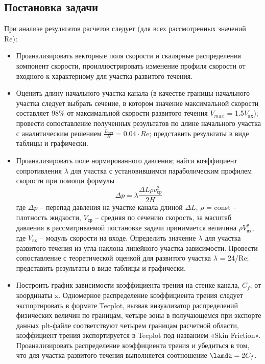 \documentclass[12pt, a4paper]{article}
\begin{document}
\subsection{Постановка задачи}
При анализе результатов расчетов следует (для всех рассмотренных значений Re):
\begin{itemize}
    \item 
        Проанализировать векторные поля скорости и скалярные распределения компонент скорости, проиллюстрировать изменение профиля скорости от входного к характерному для участка развитого течения.
    \item
        Оценить длину начального участка канала (в качестве границы начального участка следует выбрать сечение, в котором значение максимальной скорости составляет $98\%$ от максимальной скорости развитого течения $V_{max}$ = 1.5$V_{вх}$); провести сопоставление полученных результатов по длине начального участка с аналитическим решением $\frac{L_{нач}}{H} = 0.04 \cdot Re$; представить результаты в виде таблицы и графически.
    \item
        Проанализировать поле нормированного давления; найти коэффициент сопротивления $\lambda$ для участка с установившимся параболическим профилем скорости при помощи формулы 
        \begin{equation}
            \Delta p = \lambda \frac{\Delta L \rho v_{ср}^2}{2H}
        \end{equation}
        где $\Delta p$ – перепад давления на участке канала длиной $\Delta L$, $\rho$ = const – плотность жидкости, $V_{ср}$ – средняя по сечению скорость, за масштаб давления в рассматриваемой постановке задачи принимается величина $\rho V_{вх}^2$, где $V_{вх}$ – модуль скорости на входе. Определить значение $\lambda$ для участка развитого течения из угла наклона линейного участка зависимости. Провести сопоставление с теоретической оценкой для развитого участка $\lambda$ = 24/Re; представить результаты в виде таблицы и графически.
    \item
        Построить график зависимости коэффициента трения на стенке канала, $C_f$, от координаты x. Одномерное распределение коэффициента трения следует экспортировать в формате Tecplot, вызвав визуализатор распределений физических величин по границам, четыре зоны в получающемся при экспорте данных plt-файле соответствуют четырем границам расчетной области, коэффициент трения экспортируется в Tecplot под названием «Skin Friction». Проанализировать распределение коэффициента трения и убедиться в том, что для участка развитого течения выполняется соотношение  $\lamda = 2C_f$.
\end{itemize}
\end{document}
